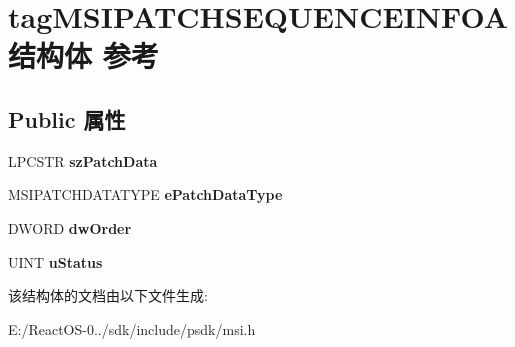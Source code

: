 \hypertarget{structtag_m_s_i_p_a_t_c_h_s_e_q_u_e_n_c_e_i_n_f_o_a}{}\section{tag\+M\+S\+I\+P\+A\+T\+C\+H\+S\+E\+Q\+U\+E\+N\+C\+E\+I\+N\+F\+O\+A结构体 参考}
\label{structtag_m_s_i_p_a_t_c_h_s_e_q_u_e_n_c_e_i_n_f_o_a}
\subsection*{Public 属性}
\begin{DoxyCompactItemize}
\item 
\mbox{\label{structtag_m_s_i_p_a_t_c_h_s_e_q_u_e_n_c_e_i_n_f_o_a_a210f3df5941e8e4bc251302f485affdf}} 
L\+P\+C\+S\+TR {\bfseries sz\+Patch\+Data}
\item 
\mbox{\label{structtag_m_s_i_p_a_t_c_h_s_e_q_u_e_n_c_e_i_n_f_o_a_afeaa61b131f8483e31530c21c189398d}} 
M\+S\+I\+P\+A\+T\+C\+H\+D\+A\+T\+A\+T\+Y\+PE {\bfseries e\+Patch\+Data\+Type}
\item 
\mbox{\label{structtag_m_s_i_p_a_t_c_h_s_e_q_u_e_n_c_e_i_n_f_o_a_ab49a4e827d01e60d686df311041cc614}} 
D\+W\+O\+RD {\bfseries dw\+Order}
\item 
\mbox{\label{structtag_m_s_i_p_a_t_c_h_s_e_q_u_e_n_c_e_i_n_f_o_a_ad42a8d81ba092a243652ad00e0ddb607}} 
U\+I\+NT {\bfseries u\+Status}
\end{DoxyCompactItemize}


该结构体的文档由以下文件生成\+:\begin{DoxyCompactItemize}
\item 
E\+:/\+React\+O\+S-\/0../sdk/include/psdk/msi.\+h\end{DoxyCompactItemize}
